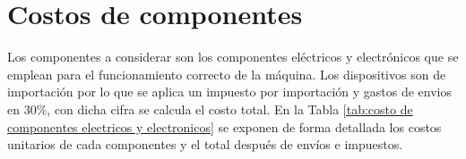 
\section{Costos de componentes}

Los componentes a considerar son los componentes eléctricos y electrónicos que se emplean para el funcionamiento correcto de la máquina. Los dispositivos son de importación por lo que se aplica un impuesto por importación y gastos de envios en 30\%, con dicha cifra se calcula el costo total. En la Tabla \ref{tab:costo de componentes electricos y electronicos} se exponen de forma detallada los costos unitarios de cada componentes y el total después de envíos e impuestos.


